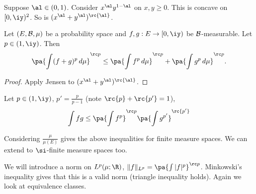 Suppose $\al\in(0,1)$. Consider $x^{\al}y^{1-\al}$ on $x,y\ge 0$. This is concave on $[0,\iy)^2$. So is $(x^{\al}+y^{\al}) ^{\rc{\al}}$. 

\begin{thm}
Let $(E,\cal B,\mu)$ be a probability space and $f,g:E\to [0,\iy)$ be $\cal B$-measurable. Let $p\in (1,\iy)$. Then
\[
\pa{
\int(f+g)^p\,d\mu
}^{\rc p}\le \pa{\int f^p\,d\mu}^{\rc p}+\pa{\int g^p\,d\mu}^{\rc p}.
\] 
\end{thm}
\begin{proof}
Apply Jensen to $(x^{\al}+y^{\al}) ^{\rc{\al}}$.
\end{proof}
\begin{thm}
Let $p\in (1,\iy)$,  $p'=\frac{p}{p-1}$ (note $\rc{p}+\rc{p'}=1$), 
\[
\int fg\le \pa{\int f^p}^{\rc p}\pa{\int g^{p'}}^{\rc{p'}}
\]
\end{thm}
Considering $\frac{\mu}{\mu(E)}$ gives the above inequalities for finite measure spaces. We can extend to $\si$-finite measure spaces too.

We will introduce a norm on $L^p(\mu;\R)$, $\Vert f\Vert_{L^p}=\pa{\int |f|^p}^{\rc p}$. Minkowski's inequality gives that this is a valid norm (triangle inequality holds). Again we look at equivalence classes. 